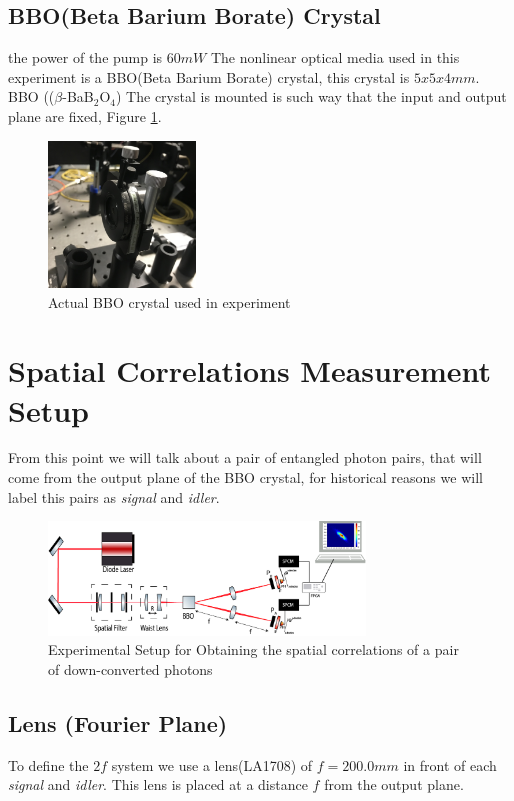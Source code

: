 \subsection{BBO(Beta Barium Borate) Crystal}

the power of the pump is $60mW$
The nonlinear optical media used in this experiment is a BBO(Beta Barium Borate) crystal, this crystal is $5x5x4 mm$.
BBO (($\beta$-BaB$_{2}$O$_4$)
The crystal is mounted is such way that the input and output plane are fixed, Figure \ref{fig:bbo}.
\begin{figure}
\centering
\includegraphics[width=0.35\textwidth]{Figures/bbo.jpg}
\caption{Actual BBO crystal used in experiment} 
\label{fig:bbo}
\end{figure}
 



\section{Spatial Correlations Measurement Setup}
From this point we will talk about a pair of entangled photon pairs, that will come from the output plane of the BBO 
crystal, for historical reasons we will label this pairs as \textit{signal} and \textit{idler}.

\begin{figure}[h!]
\centering
\includegraphics[width=0.75\textwidth]{Figures/spatialCorrelationSetup.png}
\caption{Experimental Setup for Obtaining the spatial correlations of a pair of down-converted photons} 
\label{fig:spatialSetup}
\end{figure}

\subsection{Lens (Fourier Plane)}
To define the $2f$ system we use a lens(LA1708) of $f=200.0mm$ in front of each \textit{signal} and \textit{idler}. 
This lens is placed at a distance $f$ from the output plane.


